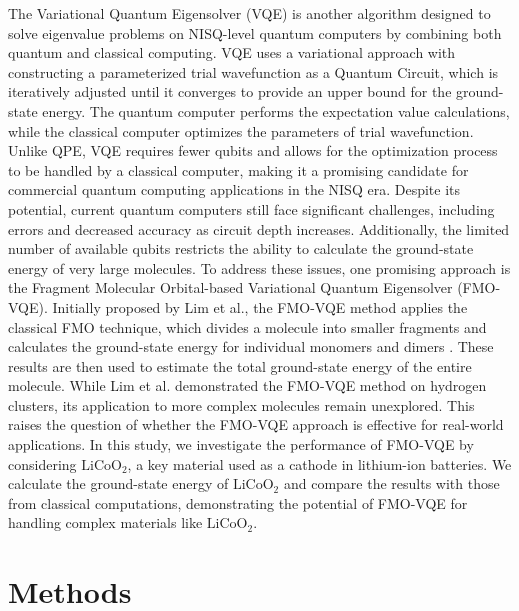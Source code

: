 \documentclass[pdflatex,sn-mathphys-num]{sn-jnl}%
\theoremstyle{thmstyleone}%
\theoremstyle{thmstyletwo}%
\theoremstyle{thmstylethree}%
\begin{document}
The Variational Quantum Eigensolver (VQE) is another algorithm designed to solve eigenvalue problems on NISQ-level quantum computers by combining both quantum and classical computing\cite{VQE1,VQE2,VQE3,VQE4}.
VQE uses a variational approach with constructing a parameterized trial wavefunction as a Quantum Circuit, 
which is iteratively adjusted until it converges to provide an upper bound for the ground-state energy. 
The quantum computer performs the expectation value calculations, while the classical computer optimizes the parameters of trial wavefunction.
Unlike QPE, VQE requires fewer qubits and allows for the optimization process to be handled by a classical computer, 
making it a promising candidate for commercial quantum computing applications in the NISQ era. 
Despite its potential, current quantum computers still face significant challenges, including errors and decreased accuracy as circuit depth increases. 
Additionally, the limited number of available qubits restricts the ability to calculate the ground-state energy of very large molecules. 
To address these issues, one promising approach is the Fragment Molecular Orbital-based Variational Quantum Eigensolver (FMO-VQE).
Initially proposed by Lim et al.\cite{FMOVQE}, the FMO-VQE method applies the classical FMO technique, which divides a molecule into smaller fragments and calculates the ground-state energy for individual monomers and dimers \cite{FMO1,FMO2,FMO3,FMO4}. 
These results are then used to estimate the total ground-state energy of the entire molecule. 
While Lim et al. demonstrated the FMO-VQE method on hydrogen clusters, its application to more complex molecules remain unexplored. 
This raises the question of whether the FMO-VQE approach is effective for real-world applications. 
In this study, we investigate the performance of FMO-VQE by considering \(\mathrm{LiCoO_2}\), a key material used as a cathode in lithium-ion batteries. We calculate the ground-state energy of \(\mathrm{LiCoO_2}\) and compare the results with those from classical computations, demonstrating the potential of FMO-VQE for handling complex materials like \(\mathrm{LiCoO_2}\).

\section{Methods}\label{sec2}
\end{document}
